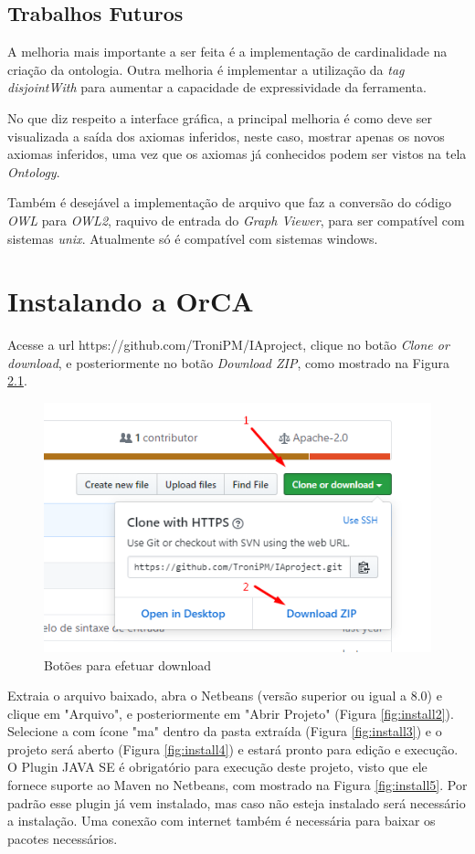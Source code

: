 \documentclass{bcc}
\begin{document}
\section{Trabalhos Futuros}
A melhoria mais importante a ser feita é a implementação de cardinalidade na criação da ontologia. Outra melhoria é implementar a utilização da \textit{tag} \textit{disjointWith} para aumentar a capacidade de expressividade da ferramenta. 

No que diz respeito a interface gráfica, a principal melhoria é como deve ser visualizada a saída dos axiomas inferidos, neste caso, mostrar apenas os novos axiomas inferidos, uma vez que os axiomas já conhecidos podem ser vistos na tela \textit{Ontology}.

Também é desejável a implementação de arquivo que faz a conversão do código \textit{OWL} para \textit{OWL2}, raquivo de entrada do \textit{Graph Viewer}, para ser compatível com sistemas \textit{unix}. Atualmente só é compatível com sistemas windows.





\appendix
\chapter{Instalando a OrCA}
\label{chap:apInstalacao}
Acesse a url https://github.com/TroniPM/IAproject, clique no botão \textit{Clone or download}, e posteriormente no botão \textit{Download ZIP}, como mostrado na Figura \ref{fig:install1}.

\begin{figure}[H]
\centering
\includegraphics[width=.7\textwidth]{Figuras/install1.png}
\caption{Botões para efetuar download} 
\label{fig:install1}
\end{figure}

Extraia o arquivo baixado, abra o Netbeans (versão superior ou igual a 8.0) e clique em "Arquivo", e posteriormente em "Abrir Projeto" (Figura \ref{fig:install2}). Selecione a com ícone "ma" dentro da pasta extraída (Figura \ref{fig:install3}) e o projeto será aberto (Figura \ref{fig:install4}) e estará pronto para edição e execução. O Plugin JAVA SE é obrigatório para execução deste projeto, visto que ele fornece suporte ao Maven no Netbeans, com mostrado na Figura \ref{fig:install5}. Por padrão esse plugin já vem instalado, mas caso não esteja instalado será necessário a instalação. Uma conexão com internet também é necessária para baixar os pacotes necessários.
\end{document}
